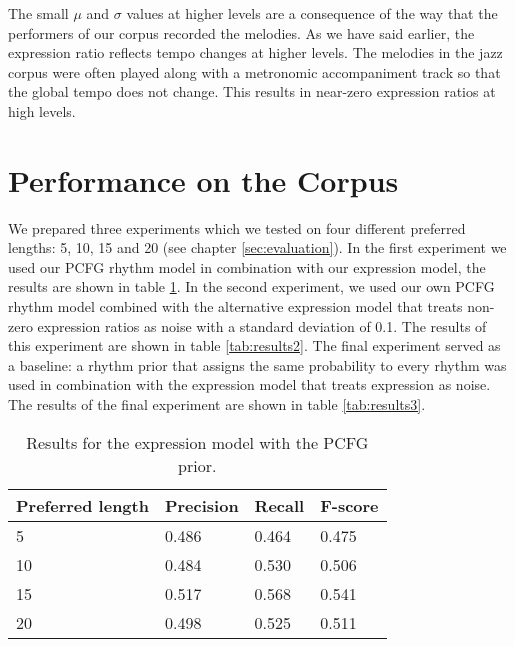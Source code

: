 The small $\mu$ and $\sigma$ values at higher levels are a consequence of the way that the performers of our corpus recorded the melodies. As we have said earlier, the expression ratio reflects tempo changes at higher levels. The melodies in the jazz corpus were often played along with a metronomic accompaniment track so that the global tempo does not change. This results in near-zero expression ratios at high levels.

\section{Performance on the Corpus}

We prepared three experiments which we tested on four different preferred lengths: 5, 10, 15 and 20 (see chapter \ref{sec:evaluation}). In the first experiment we used our PCFG rhythm model in combination with our expression model, the results are shown in table \ref{tab:results1}. In the second experiment, we used our own PCFG rhythm model combined with the alternative expression model that treats non-zero expression ratios as noise with a standard deviation of 0.1. The results of this experiment are shown in table \ref{tab:results2}. The final experiment served as a baseline: a rhythm prior that assigns the same probability to every rhythm was used in combination with the expression model that treats expression as noise. The results of the final experiment are shown in table \ref{tab:results3}.

\pagebreak
\begin{table}
\centering
\caption{Results for the expression model with the PCFG prior.}
\label{tab:results1}
\begin{tabular}{llll}
\hline
\textbf{Preferred length} & \textbf{Precision} & \textbf{Recall} & \textbf{F-score}\\
\hline
\hline
5 & 0.486 & 0.464 & 0.475\\
10 & 0.484 & 0.530 & 0.506\\
15 & 0.517 & 0.568 & 0.541\\
20 & 0.498 & 0.525 & 0.511\\
\hline
\end{tabular}
\end{table}

